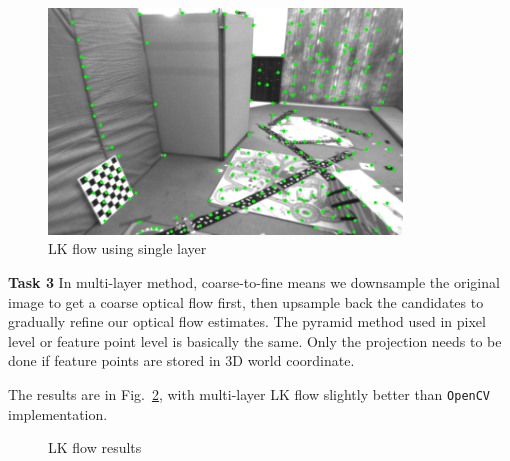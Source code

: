 \documentclass[12pt,a4paper]{article}
\begin{document}
    \begin{figure}[!h]
        \centering
        \includegraphics[height=6cm]{fig/LKflow_single.png}
        \caption{LK flow using single layer}
        \label{fig:lkflow_single}
    \end{figure}
    
    \textsf{\textbf{Task 3}}
    In multi-layer method,
    coarse-to-fine means we downsample the original image to get a coarse optical flow first,
    then upsample back the candidates to gradually refine our optical flow estimates.
    The pyramid method used in pixel level or feature point level is basically the same.
    Only the projection needs to be done if feature points are stored in 3D world coordinate.
    
    The results are in Fig.~\ref{fig:lkflow_multi},
    with multi-layer LK flow slightly better than \texttt{OpenCV} implementation.

    \begin{figure}[!ht]
        \centering
        \caption{LK flow results}
        \label{fig:lkflow_multi}
    \end{figure}
\end{document}

